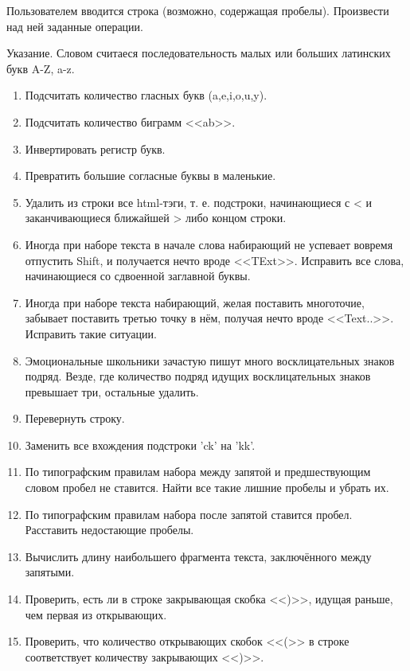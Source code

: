 
\labtask

Пользователем вводится строка (возможно, содержащая пробелы).
Произвести над ней заданные операции.

Указание. Словом считаеся последовательность малых или больших латинских букв A-Z, a-z.

\begin{enumerate}
	\item
		Подсчитать количество гласных букв (a,e,i,o,u,y).
	\item
		Подсчитать количество биграмм <<ab>>.
	\item
		Инвертировать регистр букв.
	\item
		Превратить большие согласные буквы в маленькие.
	\item
		Удалить из строки все html-тэги, т. е. подстроки, начинающиеся с < и заканчивающиеся ближайшей > либо концом строки.
	\item
		Иногда при наборе текста в начале слова набирающий не успевает вовремя отпустить Shift, и получается нечто вроде <<TExt>>.
		Исправить все слова, начинающиеся со сдвоенной заглавной буквы.
	\item
		Иногда при наборе текста набирающий, желая поставить многоточие, забывает поставить третью точку в нём, получая нечто вроде <<Text..>>.
		Исправить такие ситуации.
	\item
		Эмоциональные школьники зачастую пишут много восклицательных знаков подряд.
		Везде, где количество подряд идущих восклицательных знаков превышает три, остальные удалить.
	\item
		Перевернуть строку.
	\item
		Заменить все вхождения подстроки 'ck' на 'kk'.
	\item
		По типографским правилам набора между запятой и предшествующим словом пробел не ставится.
		Найти все такие лишние пробелы и убрать их.
	\item
		По типографским правилам набора после запятой ставится пробел.
		Расставить недостающие пробелы.
	\item
		Вычислить длину наибольшего фрагмента текста, заключённого между запятыми.
	\item
		Проверить, есть ли в строке закрывающая скобка <<)>>, идущая раньше, чем первая из открывающих.
	\item
		Проверить, что количество открывающих скобок <<(>> в строке соответствует количеству закрывающих <<)>>.

\end{enumerate}

